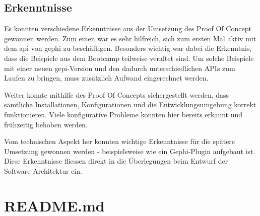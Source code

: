\subsection{Erkenntnisse}

Es konnten verschiedene Erkenntnisse aus der Umsetzung des Proof Of Concept gewonnen werden.
Zum einen war es sehr hilfreich, sich zum ersten Mal aktiv mit dem \acs{api} von \acs{gephi} zu beschäftigen. Besonders wichtig war
dabei die Erkenntnis, dass die Beispiele aus dem Bootcamp teilweise veraltet sind. Um solche Beispiele mit einer neuen \acs{gepi}-Version
und den dadurch unterschiedlichen \acs{API}s zum Laufen zu bringen, muss zusätzlich Aufwand eingerechnet werden.

Weiter konnte mithilfe des Proof Of Concepts sichergestellt werden, dass sämtliche Installationen, Konfigurationen und die
Entwicklungsumgebung korrekt funktionieren. Viele konfigurative Probleme konnten hier bereits erkannt und frühzeitig behoben werden.

Vom technischen Aspekt her konnten wichtige Erkenntnisse für die spätere Umsetzung gewonnen werden - beispielsweise
wie ein Gephi-Plugin aufgebaut ist. Diese Erkenntnisse fliessen direkt in die Überlegungen beim Entwurf der Software-Architektur ein.
\newpage

\section{README.md}
\label{readme}

